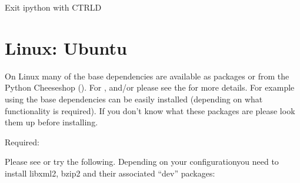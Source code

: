 \documentclass[letterpaper,10pt,english]{sphinxmanual}
\begin{document}
\sphinxAtStartPar
Exit ipython with CTRL\sphinxhyphen{}D


\section{Linux: Ubuntu}
\label{\detokenize{install_doc:linux-ubuntu}}
\sphinxAtStartPar
On Linux many of the base dependencies are available as packages or from the Python Cheeseshop ().
For ,  and/or  please see the  for more details.
For example using  the base dependencies can be easily installed (depending on what functionality is required).
If you don’t know what these packages are please look them up before installing.

\sphinxAtStartPar
Required:

\begin{sphinxVerbatim}[commandchars=\\\{\}]
    

    
\end{sphinxVerbatim}

\sphinxAtStartPar
Please see  or try the following. Depending on your configurationyou need to install libxml2, bzip2 and their associated “dev” packages:
\end{document}
